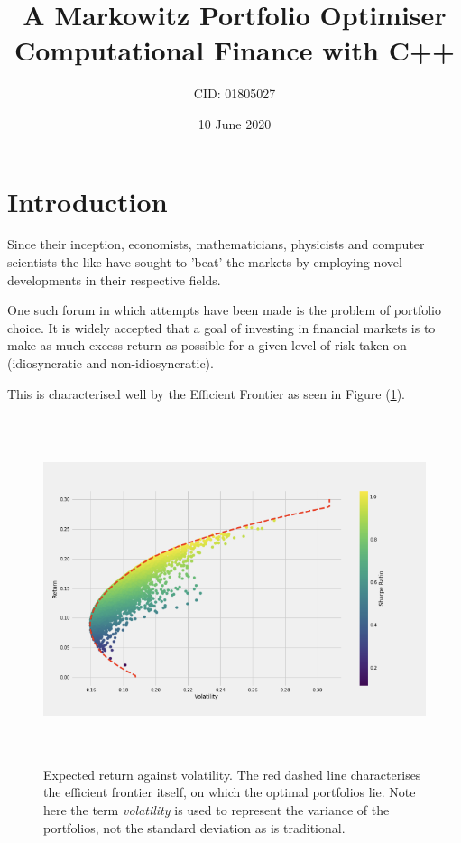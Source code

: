 \documentclass{article}
\title{%
	A Markowitz Portfolio Optimiser \\
	\large Computational Finance with C++ \\}
\author{CID: 01805027}
\date{10 June 2020}
\begin{document}
	
	
	
\renewcommand*{\arraystretch}{1.5}

\maketitle
\section{Introduction} 
\label{sec:introduction}

Since their inception, economists, mathematicians, physicists and computer scientists the like have sought to 'beat' the markets by employing novel developments in their respective fields.

One such forum in which attempts have been made is the problem of portfolio choice. It is widely accepted that a goal of investing in financial markets is to make as much excess return as possible for a given level of risk taken on (idiosyncratic and non-idiosyncratic). 

This is characterised well by the Efficient Frontier as seen in Figure (\ref{fig:efficient_frontier}).


\begin{figure}[H]
	\centerline{\includegraphics[width=\textwidth,height=4in]{figures/EF.png}}
	\caption{Expected return against volatility. The red dashed line characterises the efficient frontier itself, on which the optimal portfolios lie. \cite{ef_medium} Note here the term \textit{volatility} is used to represent the variance of the portfolios, not the standard deviation as is traditional.}
		\label{fig:efficient_frontier}
\end{figure}
\end{document}
